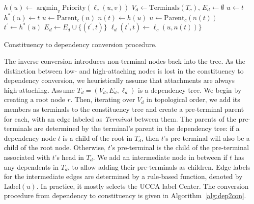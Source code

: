 \documentclass[11pt]{article}
\DeclareMathOperator*{\argmin}{argmin}
\begin{document}
\begin{algorithm}[t]
  \small
  {
  $h(u) \leftarrow \argmin_v \mathrm{Priority}(\ell_c(u,v))$\;
 }
 $V_d \leftarrow \mathrm{Terminals}({T_c})$,
 $E_d \leftarrow \emptyset$\;
  {
  $u \leftarrow t$\;
   {
  	$h^*(u) \leftarrow t$\;
  	$u \leftarrow \mathrm{Parent}_c(u)$\;
  }
  $n(t) \leftarrow h(u)$\;
 }
  {
  $u \leftarrow \mathrm{Parent}_c(n(t))$\;
  $t^\prime \leftarrow h^*(u)$\;
  $E_d \leftarrow E_d \cup \{(t^\prime, t)\}$\;
  $\ell_d (t^\prime, t) \leftarrow \ell_c(u, n(t))\}$\;
 }
 \caption{\small Constituency to dependency conversion procedure.}
 \label{alg:con2dep}
\end{algorithm}

The inverse conversion introduces non-terminal nodes back into the tree.
As the distinction between low- and high-attaching nodes is lost in the constituency to
dependency conversion, we heuristically assume that attachments are always
high-attaching.
Assume $T_d=(V_d,E_d,\ell_d)$ is a dependency tree.
We begin by creating a root node $r$.
Then, iterating over $V_d$ in topological order,
we add its members as terminals to the constituency tree
and create a pre-terminal parent for each,
with an edge labeled as \textit{Terminal} between them.
The parents of the pre-terminals are determined by the terminal's parent in the dependency
tree: if a dependency node $t$ is a child of the root in $T_d$, then $t$'s pre-terminal will also be a child of the root node. Otherwise, $t$'s pre-terminal is the child of the pre-terminal associated with $t$'s head in $T_d$. We add an intermediate node in between if $t$ has any dependents in $T_d$,
to allow adding their pre-terminals as children.
Edge labels for the intermediate edges are determined by a rule-based function, denoted by $\mathrm{Label}(u)$.
In practice, it mostly selects the UCCA label Center.
The conversion procedure from dependency to constituency is given in Algorithm~\ref{alg:dep2con}.
\end{document}
